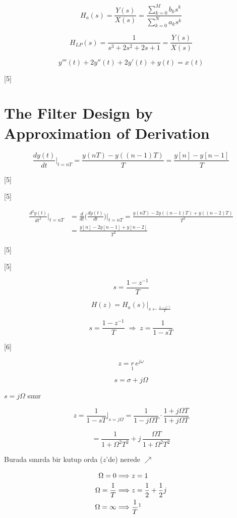 \documentclass[11pt,a4paper]{article}
\begin{document}
\[ H_a(s) = \frac{Y(s)}{X(s)} = \frac{\sum_{k=0}^{M} b_k s^k}{\sum_{k=0}^{N} a_k s^k} \]

\[ H_{LP}(s) = \frac{1}{s^3 + 2s^2 + 2s + 1} = \frac{Y(s)}{X(s)} \]

\[ y'''(t) + 2y''(t) + 2y'(t) + y(t) = x(t) \]

[5]

\section{The Filter Design by Approximation of Derivation}

\[ \frac{dy(t)}{dt}\Big|_{t=nT} = \frac{y(nT) - y((n-1)T)}{T} = \frac{y[n] - y[n-1]}{T} \]

[5]

[5]

\begin{align*}
\frac{d^2 y(t)}{dt^2}\Big|_{t=nT} &= \frac{d}{dt}\Big(\frac{dy(t)}{dt}\Big)\Big|_{t=nT} = \frac{y(nT) - 2y((n-1)T) + y((n-2)T)}{T^2} \\
&= \frac{y[n] - 2y[n-1] + y[n-2]}{T^2}
\end{align*}

[5]

[5]

\[ s = \frac{1 - z^{-1}}{T} \]

\[ H(z) = H_a(s)\Big|_{s \leftarrow \frac{1-z^{-1}}{T}} \]

\[ s = \frac{1 - z^{-1}}{T} \;\Longrightarrow\; z = \frac{1}{1 - sT} \]

[6]

\[ z = \underset{1}{r}\, e^{j\omega} \]

\[ s = \sigma + j\Omega \]

$s = j\Omega$ sınır

\[ z = \frac{1}{1 - sT}\Big|_{s=j\Omega} = \frac{1}{1 - j\Omega T}\cdot\frac{1 + j\Omega T}{1 + j\Omega T} \]

\[ {}= \frac{1}{1 + \Omega^2 T^2} + j\,\frac{\Omega T}{1 + \Omega^2 T^2} \]

Burada sınırda bir kutup orda ($z$'de) nerede $\nearrow$

\begin{align*}
\Omega = 0 &\Longrightarrow z = 1 \\
\Omega = \frac{1}{T} &\Longrightarrow z = \frac{1}{2} + \frac{1}{2}j \\
\Omega = \infty &\Longrightarrow \frac{1}{T}\footnotemark
\end{align*}
\end{document}
